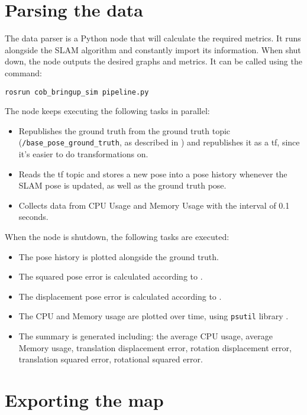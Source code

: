 \section{Parsing the data}

The data parser is a Python node that will calculate the required metrics. It runs alongside the SLAM algorithm and constantly import its information. When shut down, the node outputs the desired graphs and metrics. It can be called using the command:

\begin{verbatim}
rosrun cob_bringup_sim pipeline.py
\end{verbatim}

The node keeps executing the following tasks in parallel:

\begin{itemize}
    \item Republishes the ground truth from the ground truth topic (\texttt{/base\_pose\_ground\_truth}, as described in ) and republishes it as a tf, since it's easier to do transformations on.
    \item Reads the tf topic and stores a new pose into a pose history whenever the SLAM pose is updated, as well as the ground truth pose.
    \item Collects data from CPU Usage and Memory Usage with the interval of 0.1 seconds.
\end{itemize}

When the node is shutdown, the following tasks are executed:

\begin{itemize}
    \item The pose history is plotted alongside the ground truth.
    \item The squared pose error is calculated according to .
    \item The displacement pose error is calculated according to .
    \item The CPU and Memory usage are plotted over time, using \texttt{psutil} library \cite{psutil}.
    \item The summary is generated including: the average CPU usage, average Memory usage, translation displacement error, rotation displacement error, translation squared error, rotational squared error.
\end{itemize}

\section{Exporting the map}

